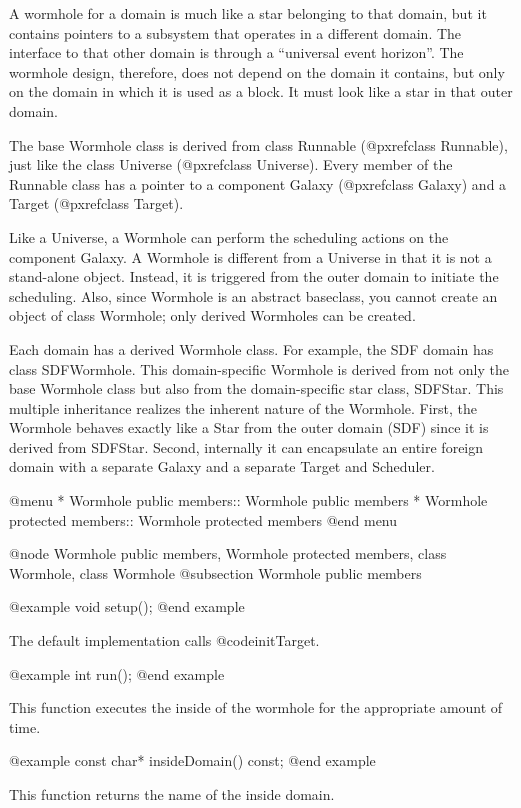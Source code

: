 A wormhole for a domain is much like a star belonging to that domain,
but it contains pointers to a subsystem that operates in a different
domain.  The interface to that other domain is through a ``universal
event horizon''.  The wormhole design, therefore, does not depend on the
domain it contains, but only on the domain in which it is used as a
block.  It must look like a star in that outer domain.

The base Wormhole class is derived from
class Runnable (@pxref{class Runnable}), just like the
class Universe (@pxref{class Universe}).
Every member of the Runnable class has a pointer to a
component Galaxy (@pxref{class Galaxy}) and a Target (@pxref{class
Target}).

Like a Universe, a Wormhole can perform
the scheduling actions on the component Galaxy. A Wormhole is different
from a Universe in that it is not a stand-alone object.  Instead, it is
triggered from the outer domain to initiate the scheduling.  Also, since
Wormhole is an abstract baseclass, you cannot create an object of class
Wormhole; only derived Wormholes can be created.

Each domain has a derived Wormhole class.  For example, the SDF domain
has class SDFWormhole.  This domain-specific Wormhole is derived from
not only the base Wormhole class but also from the domain-specific star
class, SDFStar.  This multiple inheritance realizes the inherent nature
of the Wormhole.  First, the Wormhole behaves exactly like a Star from
the outer domain (SDF) since it is derived from SDFStar.  Second,
internally it can encapsulate an entire foreign domain with a separate
Galaxy and a separate Target and Scheduler.

@menu
* Wormhole public members::     Wormhole public members
* Wormhole protected members::  Wormhole protected members
@end menu

@node Wormhole public members, Wormhole protected members, class Wormhole, class Wormhole
@subsection Wormhole public members

@example
void setup();
@end example

The default implementation calls @code{initTarget}.

@example
int run();
@end example

This function executes the inside of the wormhole for the appropriate
amount of time.

@example
const char* insideDomain() const;
@end example

This function returns the name of the inside domain.

